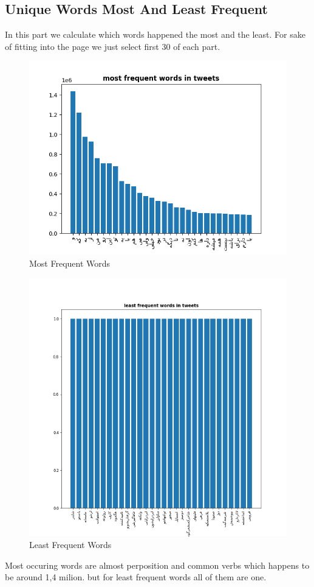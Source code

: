 \documentclass[10pt, a4paper]{article}
\begin{document}
\subsection{Unique Words Most And Least Frequent}
In this part we calculate which words happened the most and the least. For sake of fitting into the page
we just select first 30 of each part.
\begin{figure}[H]
    \begin{center}
        \includegraphics[width=0.6\linewidth]{../stats/most_frequent.png}
        \caption{Most Frequent Words}
    \end{center}
\end{figure}
\begin{figure}[H]
    \begin{center}
        \includegraphics[width=0.6\linewidth]{../stats/least_frequent.png}
        \caption{Least Frequent Words}
    \end{center}
\end{figure}

Most occuring words are almost perposition and common verbs which happens to be around 1,4 milion. but for least frequent words all of them
are one.
\end{document}
